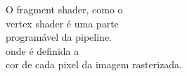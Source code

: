 \documentclass[preview]{standalone}
\begin{document}
O fragment shader, como o\\vertex shader é uma parte\\programável da pipeline.\\onde é definida a\\cor de cada pixel da imagem rasterizada.\\
\end{document}
